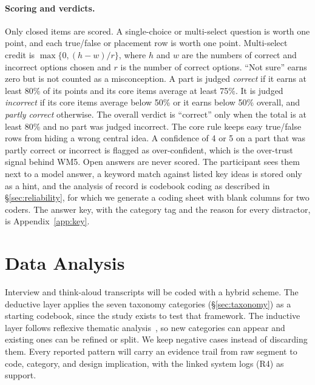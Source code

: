 \documentclass[sigconf]{acmart}
\begin{document}
\paragraph{Scoring and verdicts.}
Only closed items are scored. A single-choice or multi-select question is worth one point, and each true/false or placement row is worth one point. Multi-select credit is $\max\{0,(h-w)/r\}$, where $h$ and $w$ are the numbers of correct and incorrect options chosen and $r$ is the number of correct options. ``Not sure'' earns zero but is not counted as a misconception. A part is judged \emph{correct} if it earns at least 80\% of its points and its core items average at least 75\%. It is judged \emph{incorrect} if its core items average below 50\% or it earns below 50\% overall, and \emph{partly correct} otherwise. The overall verdict is ``correct'' only when the total is at least 80\% and no part was judged incorrect. The core rule keeps easy true/false rows from hiding a wrong central idea. A confidence of 4 or 5 on a part that was partly correct or incorrect is flagged as over-confident, which is the over-trust signal behind WM5. Open answers are never scored. The participant sees them next to a model answer, a keyword match against listed key ideas is stored only as a hint, and the analysis of record is codebook coding as described in \S\ref{sec:reliability}, for which we generate a coding sheet with blank columns for two coders. The answer key, with the category tag and the reason for every distractor, is Appendix~\ref{app:key}.

\section{Data Analysis}\label{sec:analysis}

Interview and think-aloud transcripts will be coded with a hybrid scheme. The deductive layer applies the seven taxonomy categories (\S\ref{sec:taxonomy}) as a starting codebook, since the study exists to test that framework. The inductive layer follows reflexive thematic analysis~\cite{braun2006using}, so new categories can appear and existing ones can be refined or split. We keep negative cases instead of discarding them. Every reported pattern will carry an evidence trail from raw segment to code, category, and design implication, with the linked system logs (R4) as support.
\end{document}
